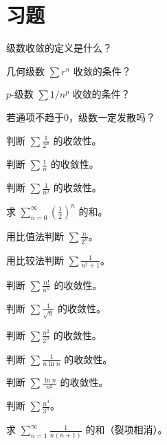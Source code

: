 \section{习题}
\begin{exercise}[0] 级数收敛的定义是什么？\end{exercise}
\begin{exercise}[0] 几何级数 \(\sum r^n\) 收敛的条件？\end{exercise}
\begin{exercise}[0] \(p\)-级数 \(\sum 1/n^p\) 收敛的条件？\end{exercise}
\begin{exercise}[0] 若通项不趋于0，级数一定发散吗？\end{exercise}
\begin{exercise}[1] 判断 \(\sum \frac1{2^n}\) 的收敛性。\end{exercise}
\begin{exercise}[1] 判断 \(\sum \frac1{n}\) 的收敛性。\end{exercise}
\begin{exercise}[1] 判断 \(\sum \frac1{n^2}\) 的收敛性。\end{exercise}
\begin{exercise}[1] 求 \(\sum_{n=0}^\infty (\frac12)^n\) 的和。\end{exercise}
\begin{exercise}[2] 用比值法判断 \(\sum \frac{n}{2^n}\)。\end{exercise}
\begin{exercise}[2] 用比较法判断 \(\sum \frac1{n^2+1}\)。\end{exercise}
\begin{exercise}[2] 判断 \(\sum \frac{n!}{n^n}\) 的收敛性。\end{exercise}
\begin{exercise}[2] 判断 \(\sum \frac{1}{\sqrt{n}}\) 的收敛性。\end{exercise}
\begin{exercise}[3] 判断 \(\sum \frac{n^2}{2^n}\) 的收敛性。\end{exercise}
\begin{exercise}[3] 判断 \(\sum \frac{1}{n\ln n}\) 的收敛性。\end{exercise}
\begin{exercise}[3] 判断 \(\sum \frac{\ln n}{n^2}\) 的收敛性。\end{exercise}
\begin{exercise}[3] 判断 \(\sum \frac{n^3}{3^n}\)。\end{exercise}
\begin{exercise}[3] 求 \(\sum_{n=1}^\infty \frac1{n(n+1)}\) 的和（裂项相消）。\end{exercise}
